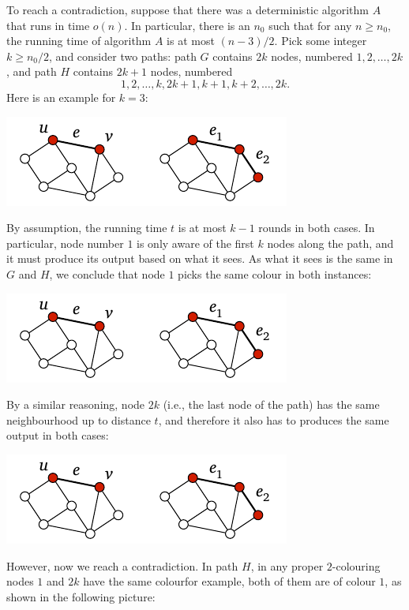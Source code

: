 To reach a contradiction, suppose that there was a deterministic algorithm $A$ that runs in time $o(n)$. In particular, there is an $n_0$ such that for any $n \ge n_0$, the running time of algorithm $A$ is at most $(n-3)/2$. Pick some integer $k \ge n_0/2$, and consider two paths: path $G$ contains $2k$ nodes, numbered $1,2,\dotsc,2k$, and path $H$ contains $2k+1$ nodes, numbered \[1,2,\dotsc,k,2k+1,k+1,k+2,\dotsc,2k.\] Here is an example for $k = 3$:
\begin{center}
    \includegraphics[page=\PIntroLbTwoA]{figs.pdf}
\end{center}
By assumption, the running time $t$ is at most $k-1$ rounds in both cases. In particular, node number $1$ is only aware of the first $k$ nodes along the path, and it must produce its output based on what it sees. As what it sees is the same in $G$ and $H$, we conclude that node $1$ picks the same colour in both instances:
\begin{center}
    \includegraphics[page=\PIntroLbTwoB]{figs.pdf}
\end{center}
By a similar reasoning, node $2k$ (i.e., the last node of the path) has the same neighbourhood up to distance $t$, and therefore it also has to produces the same output in both cases:
\begin{center}
    \includegraphics[page=\PIntroLbTwoC]{figs.pdf}
\end{center}
However, now we reach a contradiction. In path $H$, in any proper $2$-colouring nodes $1$ and $2k$ have the same colour\mydash for example, both of them are of colour $1$, as shown in the following picture:
